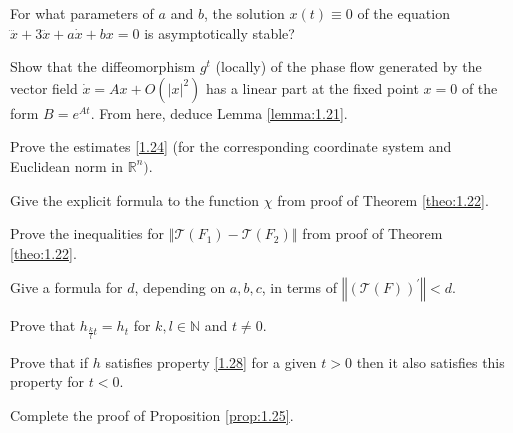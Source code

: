 \begin{task}
	For what parameters of $ a $ and $ b $, the solution $ x (t) \equiv 0 $ of the equation $ \dddot {x} +3 \ddot {x} + a \dot {x} + bx = 0 $ is asymptotically stable?
\end{task}
\begin{task}
	Show that the diffeomorphism $ g ^ {t} $ (locally) of the phase flow generated by the vector field $ \dot{x}=Ax+O\left( \left\vert x\right\vert ^{2} \right)$ has a linear part at the fixed point $ x = 0 $ of the form $ B = e ^ {At} $. From here, deduce Lemma \ref{lemma:1.21}.
\end{task}
\begin{task}
	Prove the estimates \eqref{1.24} (for the corresponding coordinate system and Euclidean norm in $ \mathbb {R} ^ {n}) $.
\end{task}
\begin{task}
	Give the explicit formula to the function $ \chi $ from proof of Theorem \ref{theo:1.22}.
\end{task}
\begin{task}
	Prove the inequalities for $ \left \Vert \mathcal {T} (F_ {1}) - \mathcal {T} (F_ {2}) \right \Vert $  from proof of Theorem \ref{theo:1.22}.
\end{task}
\begin{task}
	Give a formula for $ d $, depending on $ a, b, c $, in terms of $ \left \Vert (\mathcal {T} (F)) ^ {\prime} \right \Vert <d $.
\end{task}
\begin{task}
	Prove that $h_{\frac{k}{l}t}=h_{t}$ for $ k, l \in \mathbb {N} $ and $ t \not = 0 $.
\end{task}
\begin{task}
	Prove that if $ h $ satisfies property \eqref{1.28} for a given $ t> 0 $ then it also satisfies this property for $ t <0 $.
\end{task}
\begin{task}
	Complete the proof of Proposition \ref{prop:1.25}.
\end{task}